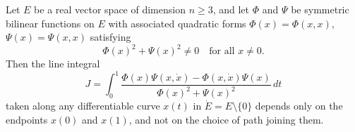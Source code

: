 Let $E$ be a real vector space of dimension $n \geq 3$, and let $\Phi$ and $\Psi$ be symmetric bilinear functions on $E$ with associated quadratic forms $\Phi(x) = \Phi(x,x)$, $\Psi(x) = \Psi(x,x)$ satisfying
$$\Phi(x)^2 + \Psi(x)^2 \neq 0 \quad \text{for all } x \neq 0.$$
Then the line integral
$$J = \int_0^1 \frac{\Phi(x)\Psi(x, \dot{x}) - \Phi(x, \dot{x})\Psi(x)}{\Phi(x)^2 + \Psi(x)^2} \, dt$$
taken along any differentiable curve $x(t)$ in $\dot{E} = E \setminus \{0\}$ depends only on the endpoints $x(0)$ and $x(1)$, and not on the choice of path joining them.
